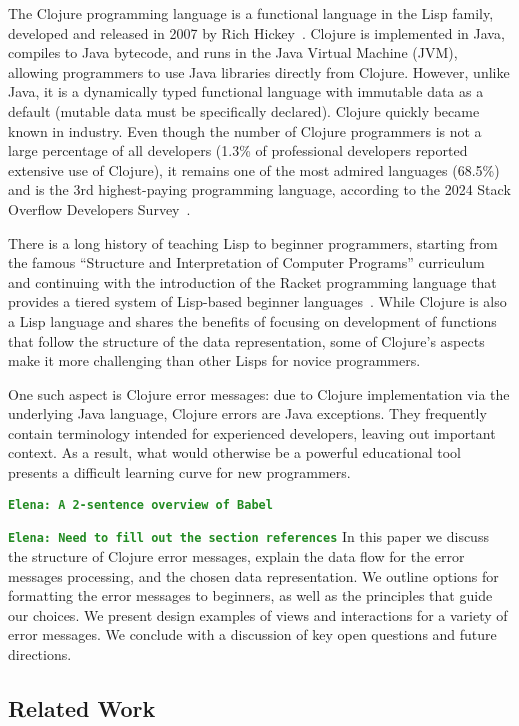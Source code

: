 \documentclass[12pt]{article}
\newcommand{\comment}[1]{{\bf \tt  {#1}}}
\newcommand{\emcomment}[1]{\textcolor{ForestGreen}{\comment{Elena: {#1}}}}
\begin{document}
The Clojure programming language is a functional language in the Lisp family, developed and released in 2007 
by Rich Hickey~\cite{Hickey:2008}. 
Clojure is implemented in Java, compiles to Java bytecode, and runs in the Java Virtual Machine (JVM), 
allowing programmers to use Java libraries directly from Clojure. 
However, unlike Java, it is a dynamically typed functional language with immutable data as a default (mutable data 
must be specifically declared).
Clojure quickly became known in industry. Even though the number of Clojure programmers is not a large percentage
of all developers (1.3\% of professional developers reported extensive use of Clojure), it remains one of the most admired languages (68.5\%) and is the 3rd highest-paying programming language, according to the 2024 Stack Overflow Developers Survey~\cite{survey}.

There is a long history of teaching Lisp to beginner programmers, starting from the famous  ``Structure and Interpretation of Computer Programs'' curriculum~\cite{Abelson} and continuing with the introduction of the 
Racket programming language that provides a tiered system of Lisp-based beginner languages~\cite{Felleisen:2004,racket}. While Clojure is also a Lisp language and shares the benefits of focusing on development of functions that follow the structure of the data representation, some of Clojure's aspects make it more challenging than other Lisps for novice programmers. 

One such aspect is Clojure error messages: due to Clojure implementation via the underlying Java language, 
Clojure errors are Java exceptions. 
They frequently contain terminology intended for experienced developers, leaving out important context. 
As a result, what would otherwise be a powerful educational tool presents a difficult learning curve for new programmers.

\emcomment{A 2-sentence overview of Babel}

\emcomment{Need to fill out the section references}
In this paper we discuss the structure of Clojure error messages, 
explain the data flow for the error messages processing, 
and the chosen data representation. 
We outline options for formatting the error messages to beginners, as well as the principles that guide our choices. 
We present design examples of views and interactions for a variety of error messages. 
We conclude with a discussion of key open questions and future directions. 

\subsection{Related Work}\label{subsec:related}
\end{document}
